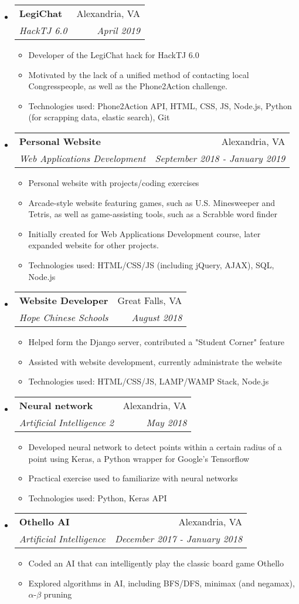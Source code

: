 \documentclass[letterpaper,11pt]{article}
\makeatletter
\newcommand{\resitem}[1]{\item #1 \vspace{-2pt}}
\newcommand{\ressubheading}[4]{
\begin{tabular*}{7.0in}{l@{\extracolsep{\fill}}r}
		\textbf{#1} & #2 \\
		\textit{#3} & \textit{#4} \\
\end{tabular*}\vspace{-6pt}}
\makeatother
\begin{document}
\begin{itemize}
\item
    \ressubheading{LegiChat}{Alexandria, VA}{HackTJ 6.0}{April 2019}
	\begin{itemize}
		\resitem{Developer of the LegiChat hack for HackTJ 6.0}
		\resitem{Motivated by the lack of a unified method of contacting local Congresspeople, as well as the Phone2Action challenge.}
		\resitem{Technologies used: Phone2Action API, HTML, CSS, JS, Node.js, Python (for scrapping data, elastic search), Git}
	\end{itemize}
\item
    \ressubheading{Personal Website}{Alexandria, VA}{Web Applications Development}{September 2018 - January 2019}
	\begin{itemize}
		\resitem{Personal website with projects/coding exercises}
		\resitem{Arcade-style website featuring games, such as U.S. Minesweeper and Tetris, as well as game-assisting tools, such as a Scrabble word finder}
		\resitem{Initially created for Web Applications Development course, later expanded website for other projects.}
		\resitem{Technologies used: HTML/CSS/JS (including jQuery, AJAX), SQL, Node.js}
	\end{itemize}
\item
    \ressubheading{Website Developer}{Great Falls, VA}{Hope Chinese Schools}{August 2018}
	\begin{itemize}
		\resitem{Helped form the Django server, contributed a "Student Corner" feature}
		\resitem{Assisted with website development, currently administrate the website}
		\resitem{Technologies used: HTML/CSS/JS, LAMP/WAMP Stack, Node.js}
	\end{itemize}
\item
    \ressubheading{Neural network}{Alexandria, VA}{Artificial Intelligence 2}{May 2018}
    \begin{itemize}
        \resitem{Developed neural network to detect points within a certain radius of a point using Keras, a Python wrapper for Google's Tensorflow}
        \resitem{Practical exercise used to familiarize with neural networks}
        \resitem{Technologies used: Python, Keras API}
    \end{itemize}
\item
    \ressubheading{Othello AI}{Alexandria, VA}{Artificial Intelligence}{December 2017 - January 2018}
    \begin{itemize}
        \resitem{Coded an AI that can intelligently play the classic board game Othello}
        \resitem{Explored algorithms in AI, including BFS/DFS, minimax (and negamax), $\alpha$-$\beta$ pruning}

\end{itemize}
\end{itemize}
\end{document}

